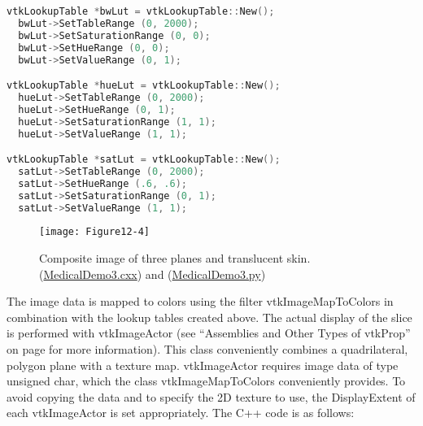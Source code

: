 \begin{lstlisting}[language=C++, caption={Lookup tables for the sectioning planes.}]
vtkLookupTable *bwLut = vtkLookupTable::New();
  bwLut->SetTableRange (0, 2000);
  bwLut->SetSaturationRange (0, 0);
  bwLut->SetHueRange (0, 0);
  bwLut->SetValueRange (0, 1);

vtkLookupTable *hueLut = vtkLookupTable::New();
  hueLut->SetTableRange (0, 2000);
  hueLut->SetHueRange (0, 1);
  hueLut->SetSaturationRange (1, 1);
  hueLut->SetValueRange (1, 1);

vtkLookupTable *satLut = vtkLookupTable::New();
  satLut->SetTableRange (0, 2000);
  satLut->SetHueRange (.6, .6);
  satLut->SetSaturationRange (0, 1);
  satLut->SetValueRange (1, 1);
\end{lstlisting}

\begin{figure}[!htb]
	\centering
	\texttt{[image: Figure12-4]}
	\caption{Composite image of three planes and translucent skin.(\href{https://lorensen.github.io/VTKExamples/site/Cxx/Medical/MedicalDemo3/}{MedicalDemo3.cxx}) and (\href{https://lorensen.github.io/VTKExamples/site/Python/Medical/MedicalDemo3/}{MedicalDemo3.py})}
	\label{fig:Figure12-4}
\end{figure}

The image data is mapped to colors using the filter vtkImageMapToColors in combination with the lookup tables created above. The actual display of the slice is performed with vtkImageActor (see ``Assemblies and Other Types of vtkProp'' on page \pageref{subsubsec:assemblies_vtkprop} for more information). This class conveniently combines a quadrilateral, polygon plane with a texture map. vtkImageActor requires image data of type unsigned char, which the class vtkImageMapToColors conveniently provides. To avoid copying the data and to specify the 2D texture to use, the DisplayExtent of each vtkImageActor is set appropriately. The C++ code is as follows:

